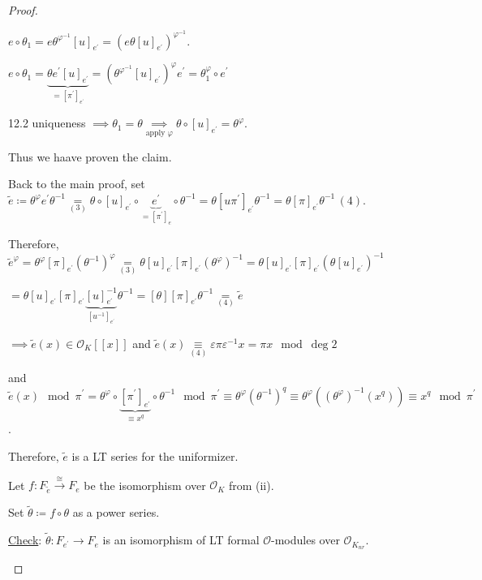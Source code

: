\documentclass[openany]{amsbook}
\numberwithin{section}{chapter}
\theoremstyle{definition}
\begin{document}
\begin{proof}
\begin{enumerate}[label=\roman*)]
        \(e \circ \theta _1 = e \theta ^{\varphi ^{-1} }[u]_{e^{\prime}} = (e \theta [u]_{e^{\prime}})^{\varphi ^{-1}}\).

        \(e \circ \theta_1 = \underbrace{\theta e^{\prime} [u]_{e^{\prime}}}_{= [\pi^{\prime}]_{e^{\prime}}} = (\theta ^{\varphi ^{-1}}[u]_{e^{\prime}})^{\varphi} e^{\prime} = \theta_1^{\varphi} \circ e^{\prime}  \) 

        12.2 uniqueness \(\implies \theta_1 = \theta \underset{\text{apply } \varphi}{\implies} \boxed{\theta \circ [u]_{e^{\prime}} = \theta ^ \varphi} \).
        
        Thus we haave proven the claim.

        Back to the main proof, set \(\widetilde{e} \coloneqq \theta ^ \varphi e^{\prime} \theta ^{-1} \underset{(3)}{=} \theta \circ [u]_{e^{\prime}} \circ \underbrace{e^{\prime}}_{=[\pi ^{\prime} ]_e} \circ \theta ^{-1} = \theta [u \pi ^{\prime} ]_{e^{\prime} } \theta ^{-1} = \theta [\pi]_{e^{\prime}} \theta ^{-1} \,(4)\).

        Therefore, \(\widetilde{e} ^ \varphi = \theta ^ \varphi  [\pi]_{e^{\prime}} (\theta ^{-1} )^ \varphi \underset{(3)}{=} \theta [u]_{e^{\prime}}[\pi]_{e^{\prime}}(\theta ^ \varphi) ^{-1} = \theta [u]_{e^{\prime}} [\pi]_{e^{\prime}} (\theta [u]_{e^{\prime}})^{-1}\)
        
        \(= \theta [u]_{e^{\prime}}[\pi]_{e^{\prime}}\underbrace{[u]_{e^{\prime}}^{-1}}_{[u^{-1}]_{e^{\prime}}} \theta ^{-1} = [\theta] [\pi]_{e^{\prime}} \theta ^{-1} \underset{(4)}{=} \widetilde{e} \) 

        \(\implies \widetilde{e}(x) \in \mathcal{O}_K[[x]]\) and \(\widetilde{e}(x) \underset{(4)}{\equiv} \varepsilon \pi \varepsilon ^{-1} x = \pi x \mod\deg 2\)

        and \(\widetilde{e}(x) \mod \pi ^{\prime} = \theta ^ \varphi \circ \underbrace{[\pi ^{\prime} ]_{e^{\prime}}}_{\equiv x^q} \circ \theta ^{-1} \mod \pi ^{\prime} \equiv \theta ^ \varphi (\theta ^{-1})^q \equiv \theta ^ \varphi ((\theta ^\varphi)^{-1} (x^q)) \equiv x^q \mod \pi^{\prime} \).
        
        Therefore, \(\widetilde{e}\) is a LT series for the uniformizer.

        Let \(f: F_{\widetilde{e}}\overset{\cong}{\to} F_e\) be the isomorphism over \(\mathcal{O}_K\) from (ii).
        
        Set \(\widetilde{\theta} \coloneqq f \circ \theta\) as a power series.

        \underline{Check}: \(\widetilde{\theta}: F_{e^{\prime}} \to F_e\) is an isomorphism of LT formal \(\mathcal{O}\)-modules over \(\mathcal{O}_{K_{nr}}\).

    \end{enumerate}

\end{proof}
\end{document}
